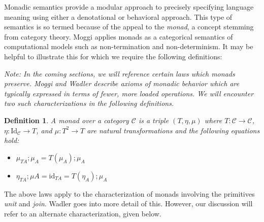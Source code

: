 \documentclass[ms]{byuprop}
\newcounter{definition}
\begin{document}

Monadic semantics provide a modular approach to precisely specifying language meaning
using either a denotational or behavioral approach. This type of semantics is so termed
because of the appeal to the \emph{monad}, a concept stemming from category theory. Moggi
\cite{moggi1989computational} applies monads as a categorical semantics of computational
models such as non-termination and non-determinism. It may be helpful to illustrate this
for which we require the following definitions:

\emph{Note: In the coming sections, we will reference certain laws which monads preserve.
Moggi \cite{moggi1989computational} and Wadler \cite{wadler1995monads} describe axioms of 
monadic behavior which are typically expressed in terms of fewer, more loaded operations. 
We will encounter two such characterizations in the following definitions.}

\newtheorem{monad}[definition]{Definition}

\begin{monad}
A \emph{monad} over a category $\mathcal{C}$ is a triple $(T,\eta,\mu)$ where
$T:\mathcal{C}\rightarrow\mathcal{C}$, $\eta:\mathrm{Id}_{\mathcal{C}}\rightarrow T$, and
$\mu:T^{2}\rightarrow T$ are \emph{natural transformations} and the following equations
hold:

\begin{itemize}
\item $\mu_{TA};\mu_{A}=T(\mu_{A});\mu_{A}$
\item $\eta_{TA};\mu{A}=\mathrm{id}_{TA}=T(\eta_{A});\mu_{A}$
\end{itemize}
\end{monad}

The above laws apply to the characterization of monads involving the primitives
\emph{unit} and \emph{join}. Wadler \cite{wadler1995monads} goes into more detail of this.
However, our discussion will refer to an alternate characterization, given below.

\newtheorem{kleisli}[definition]{Definition}
\end{document}
